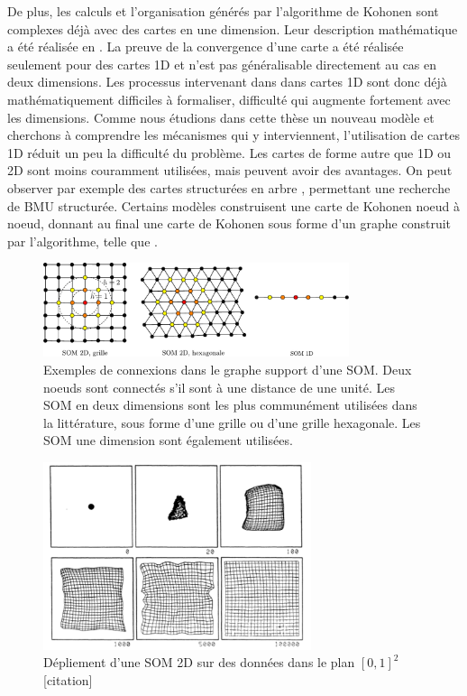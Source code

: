 De plus, les calculs et l'organisation générés par l'algorithme de Kohonen sont complexes déjà avec des cartes en une dimension. Leur description mathématique a été réalisée en \cite{cottrell_theoretical_2016,cottrell_theoretical_1998,fort_soms_2006}. La preuve de la convergence d'une carte a été réalisée seulement pour des cartes 1D et n'est pas généralisable directement au cas en deux dimensions. Les processus intervenant dans dans cartes 1D sont donc déjà mathématiquement difficiles à formaliser, difficulté qui augmente fortement avec les dimensions. Comme nous étudions dans cette thèse un nouveau modèle et cherchons à comprendre les mécanismes qui y interviennent, l'utilisation de cartes 1D réduit un peu la difficulté du problème. 
Les cartes de forme autre que 1D ou 2D sont moins couramment utilisées, mais peuvent avoir des avantages. On peut observer par exemple des cartes structurées en arbre \cite{koikkalainen_self-organizing_1990}, permettant une recherche de BMU structurée. Certains modèles construisent une carte de Kohonen noeud à noeud, donnant au final une carte de Kohonen sous forme d'un graphe construit par l'algorithme, telle que \cite{alahakoon_dynamic_2000}. 
\begin{figure}
\centering
\includegraphics[width=0.8\textwidth]{soms_topologies}
\caption{Exemples de connexions dans le graphe support d'une SOM. Deux noeuds sont connectés s'il sont à une distance de une unité. Les SOM en deux dimensions sont les plus communément utilisées dans la littérature, sous forme d'une grille ou d'une grille hexagonale. Les SOM une dimension sont également utilisées.}
\label{fig:topo}
\end{figure}

\begin{figure}
\centering
\includegraphics[width=0.7\textwidth]{som2d}
\caption{Dépliement d'une SOM 2D sur des données dans le plan $[0,1]^2$ [citation] \label{fig:som2d}}

\end{figure}


